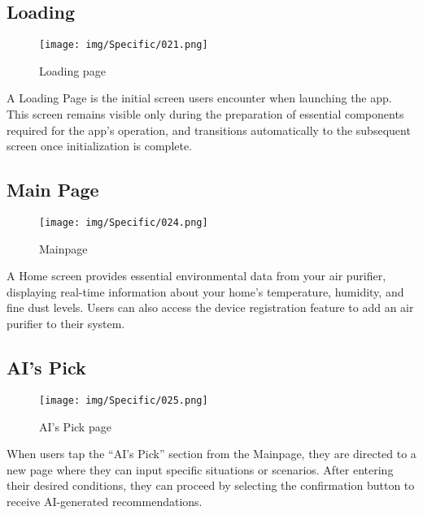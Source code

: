 \documentclass[conference]{IEEEtran}
\begin{document}
\vspace{0.7em} %

\subsection{Loading}
\vspace{0.3em}
\begin{figure}[h]
    \centering
    \texttt{[image: img/Specific/021.png]}
    \caption{Loading page}
\end{figure}
A Loading Page is the initial screen users encounter when launching the app. This screen remains visible only during the preparation of essential components required for the app's operation, and transitions automatically to the subsequent screen once initialization is complete.

\vspace{0.7em} %

\subsection{Main Page}
\vspace{0.3em}
\begin{figure}[h]
    \centering
    \texttt{[image: img/Specific/024.png]}
    \caption{Mainpage}
\end{figure}
A Home screen provides essential environmental data from your air purifier, displaying real-time information about your home's temperature, humidity, and fine dust levels. Users can also access the device registration feature to add an air purifier to their system.

\newpage

\subsection{AI's Pick}
\vspace{0.3em}
\begin{figure}[h]
    \centering
    \texttt{[image: img/Specific/025.png]}
    \caption{AI's Pick page}
\end{figure}
When users tap the “AI's Pick” section from the Mainpage, they are directed to a new page where they can input specific situations or scenarios. After entering their desired conditions, they can proceed by selecting the confirmation button to receive AI-generated recommendations.
\end{document}
